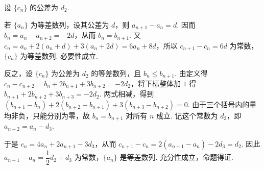 \begin{solution}
设 \(\{c_n\}\) 的公差为 \(d_2\).

若 \(\{a_n\}\) 为等差数列，设其公差为 \(d\)，则 \(a_{n+1}-a_n=d\). 因而 \(b_n=a_n-a_{n+2}=-2d\)，从而 \(b_n=b_{n+1}\). 又
\(c_n=a_n+2(a_n+d)+3(a_n+2d)=6a_n+8d\)，所以 \(c_{n+1}-c_n=6d\) 为常数，\(\{c_n\}\) 为等差数列. 必要性成立.

反之，设 \(\{c_n\}\) 为公差为 \(d_2\) 的等差数列，且 \(b_n\leqslant b_{n+1}\). 由定义得
\(c_n-c_{n+2}=b_n+2b_{n+1}+3b_{n+2}=-2d_2\)，将下标整体加 \(1\) 得
\(b_{n+1}+2b_{n+2}+3b_{n+3}=-2d_2\).
两式相减，得到
\((b_{n+1}-b_n)+2(b_{n+2}-b_{n+1})+3(b_{n+3}-b_{n+2})=0\).
由于三个括号内的量均非负，只能分别为零，故 \(b_n=b_{n+1}\) 对所有 \(n\) 成立. 记这个常数为 \(d_3\)，即 \(a_{n+2}=a_n-d_3\).

于是 \(c_n=4a_n+2a_{n+1}-3d_3\)，从而
\(c_{n+1}-c_n=2(a_{n+1}-a_n)-2d_3=d_2\). 因此 \(a_{n+1}-a_n=\dfrac12d_2+d_3\) 为常数，\(\{a_n\}\) 是等差数列. 充分性成立，命题得证.
\end{solution}
